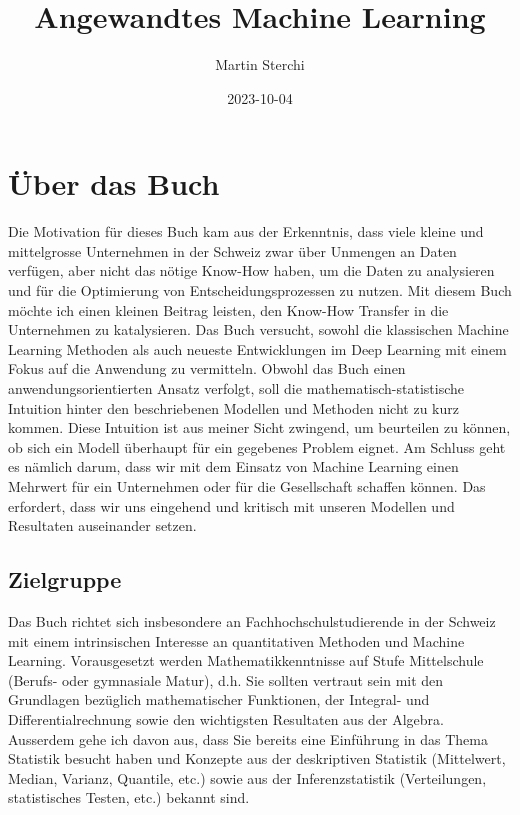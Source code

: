 \documentclass[
]{book}
\title{Angewandtes Machine Learning}
\author{Martin Sterchi}
\date{2023-10-04}
\begin{document}
\maketitle

{
\setcounter{tocdepth}{1}
\tableofcontents
}
\hypertarget{uxfcber-das-buch}{%
\chapter*{Über das Buch}\label{uxfcber-das-buch}}

Die Motivation für dieses Buch kam aus der Erkenntnis, dass viele kleine und mittelgrosse Unternehmen in der Schweiz zwar über Unmengen an Daten verfügen, aber nicht das nötige Know-How haben, um die Daten zu analysieren und für die Optimierung von Entscheidungsprozessen zu nutzen. Mit diesem Buch möchte ich einen kleinen Beitrag leisten, den Know-How Transfer in die Unternehmen zu katalysieren. Das Buch versucht, sowohl die klassischen Machine Learning Methoden als auch neueste Entwicklungen im Deep Learning mit einem Fokus auf die Anwendung zu vermitteln. Obwohl das Buch einen anwendungsorientierten Ansatz verfolgt, soll die mathematisch-statistische Intuition hinter den beschriebenen Modellen und Methoden nicht zu kurz kommen. Diese Intuition ist aus meiner Sicht zwingend, um beurteilen zu können, ob sich ein Modell überhaupt für ein gegebenes Problem eignet. Am Schluss geht es nämlich darum, dass wir mit dem Einsatz von Machine Learning einen Mehrwert für ein Unternehmen oder für die Gesellschaft schaffen können. Das erfordert, dass wir uns eingehend und kritisch mit unseren Modellen und Resultaten auseinander setzen.

\hypertarget{zielgruppe}{%
\section*{Zielgruppe}\label{zielgruppe}}

Das Buch richtet sich insbesondere an Fachhochschulstudierende in der Schweiz mit einem intrinsischen Interesse an quantitativen Methoden und Machine Learning. Vorausgesetzt werden Mathematikkenntnisse auf Stufe Mittelschule (Berufs- oder gymnasiale Matur), d.h. Sie sollten vertraut sein mit den Grundlagen bezüglich mathematischer Funktionen, der Integral- und Differentialrechnung sowie den wichtigsten Resultaten aus der Algebra. Ausserdem gehe ich davon aus, dass Sie bereits eine Einführung in das Thema Statistik besucht haben und Konzepte aus der deskriptiven Statistik (Mittelwert, Median, Varianz, Quantile, etc.) sowie aus der Inferenzstatistik (Verteilungen, statistisches Testen, etc.) bekannt sind.
\end{document}
